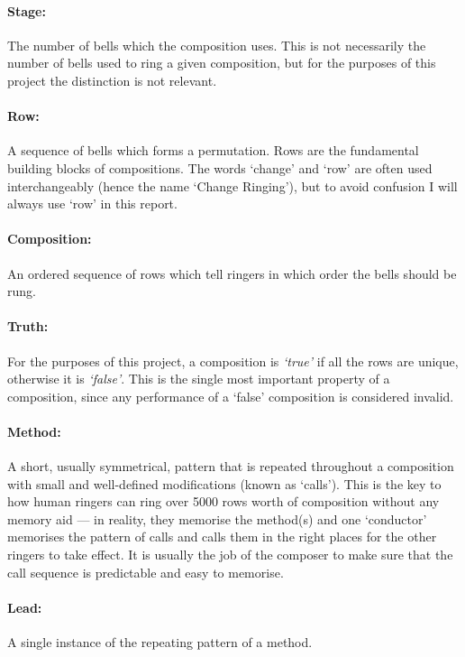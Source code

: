 \documentclass[12pt]{article}
\begin{document}
\paragraph{Stage:} The number of bells which the composition uses.  This is not necessarily the
number of bells used to ring a given composition, but for the purposes of this project the
distinction is not relevant.

\paragraph{Row:} A sequence of bells which forms a permutation.  Rows are the fundamental building
blocks of compositions.  The words `change' and `row' are often used interchangeably (hence the name
`Change Ringing'), but to avoid confusion I will always use `row' in this report.

\paragraph{Composition:} An ordered sequence of rows which tell ringers in which order the bells
should be rung.

\paragraph{Truth:} For the purposes of this project, a composition is \emph{`true'} if all the rows
are unique, otherwise it is \emph{`false'}.  This is the single most important property of a
composition, since any performance of a `false' composition is considered invalid.

\paragraph{Method:} A short, usually symmetrical, pattern that is repeated throughout a composition
with small and well-defined modifications (known as `calls').  This is the key to how human ringers
can ring over 5000 rows worth of composition without any memory aid --- in reality, they memorise
the method(s) and one `conductor' memorises the pattern of calls and calls them in the right places
for the other ringers to take effect.  It is usually the job of the composer to make sure that the
call sequence is predictable and easy to memorise.

\paragraph{Lead:} A single instance of the repeating pattern of a method.
\end{document}
